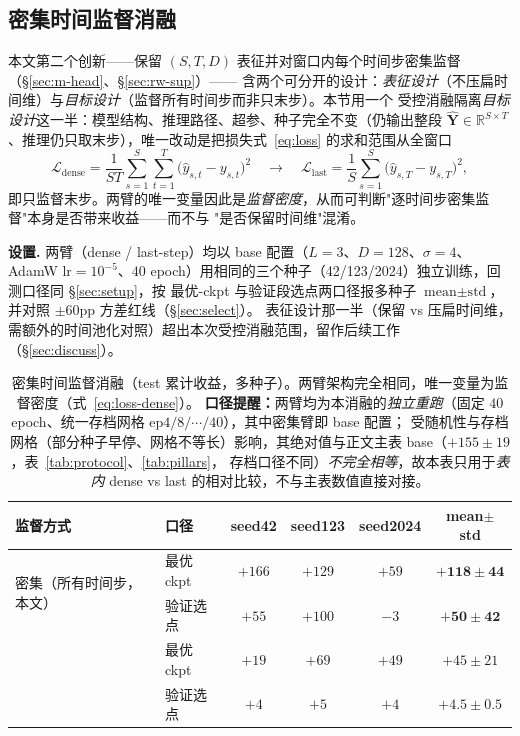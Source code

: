 \documentclass[a4paper,11pt,fontset=fandol]{ctexart}
\begin{document}
\subsection{密集时间监督消融}\label{sec:abl-dense}
本文第二个创新——保留 $(S,T,D)$ 表征并对窗口内每个时间步密集监督（§\ref{sec:m-head}、§\ref{sec:rw-sup}）——
含两个可分开的设计：\emph{表征设计}（不压扁时间维）与\emph{目标设计}（监督所有时间步而非只末步）。本节用一个
受控消融隔离\emph{目标设计}这一半：模型结构、推理路径、超参、种子完全不变（仍输出整段 $\hat{\bm{Y}}\in
\mathbb{R}^{S\times T}$、推理仍只取末步），唯一改动是把损失式~\eqref{eq:loss} 的求和范围从全窗口
\begin{equation}\label{eq:loss-dense}
\mathcal{L}_{\text{dense}}=\frac{1}{ST}\sum_{s=1}^{S}\sum_{t=1}^{T}\big(\hat y_{s,t}-y_{s,t}\big)^2
\quad\longrightarrow\quad
\mathcal{L}_{\text{last}}=\frac{1}{S}\sum_{s=1}^{S}\big(\hat y_{s,T}-y_{s,T}\big)^2 ,
\end{equation}
即只监督末步。两臂的唯一变量因此是\emph{监督密度}，从而可判断"逐时间步密集监督"本身是否带来收益——而不与
"是否保留时间维"混淆。

\textbf{\heiti 设置.} 两臂（dense / last-step）均以 base 配置（$L{=}3$、$D{=}128$、$\sigma{=}4$、AdamW
$\text{lr}{=}10^{-5}$、$40$ epoch）用相同的三个种子（42/123/2024）独立训练，回测口径同 §\ref{sec:setup}，按
最优-ckpt 与验证段选点两口径报多种子 $\text{mean}\pm\text{std}$，并对照 $\pm60$pp 方差红线（§\ref{sec:select}）。
表征设计那一半（保留 vs 压扁时间维，需额外的时间池化对照）超出本次受控消融范围，留作后续工作
（§\ref{sec:discuss}）。

\begin{table}[H]
\centering
\caption{密集时间监督消融（test 累计收益，多种子）。两臂架构完全相同，唯一变量为监督密度（式~\eqref{eq:loss-dense}）。
\textbf{口径提醒：}两臂均为本消融的\emph{独立重跑}（固定 $40$ epoch、统一存档网格 ep$4/8/\cdots/40$），其中密集臂即 base 配置；
受随机性与存档网格（部分种子早停、网格不等长）影响，其绝对值与正文主表 base（$+155\pm19$，表~\ref{tab:protocol}、\ref{tab:pillars}，
存档口径不同）\emph{不完全相等}，故本表只用于\emph{表内} dense vs last 的相对比较，不与主表数值直接对接。}
\label{tab:abl-dense}
\begin{tabular}{llcccc}
\toprule
监督方式 & 口径 & seed42 & seed123 & seed2024 & mean$\pm$std \\
\midrule
\multirow{2}{*}{密集（所有时间步，本文）} & 最优 ckpt & $+166$ & $+129$ & $+59$ & $\mathbf{+118\pm44}$ \\
                        & 验证选点 & $+55$ & $+100$ & $-3$ & $\mathbf{+50\pm42}$ \\
\addlinespace
\multirow{2}{*}{仅末步（last-step）}      & 最优 ckpt & $+19$ & $+69$ & $+49$ & $+45\pm21$ \\
       & 验证选点 & $+4$ & $+5$ & $+4$ & $+4.5\pm0.5$ \\
\bottomrule
\end{tabular}
\end{table}
\end{document}
